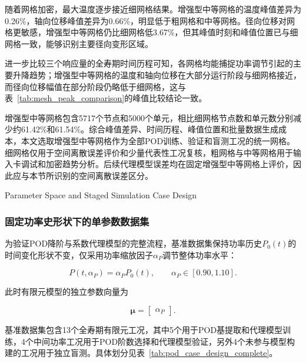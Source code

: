 随着网格加密，最大温度逐步接近细网格结果。增强型中等网格的温度峰值差异为0.26\%，轴向位移峰值差异为0.66\%，明显低于粗网格和中等网格。径向位移对网格更敏感，增强型中等网格仍比细网格低3.67\%，但其峰值时刻和峰值位置已与细网格一致，能够识别主要径向变形区域。

进一步比较三个响应量的全寿期时间历程可知，各网格均能捕捉功率调节引起的主要升降趋势；增强型中等网格的温度和轴向位移在大部分运行阶段与细网格接近，而径向位移幅值在部分阶段仍略低于细网格，这与表~\ref{tab:mesh_peak_comparison}的峰值比较结论一致。

增强型中等网格包含5717个节点和5000个单元，相比细网格节点数和单元数分别减少约61.42\%和61.54\%。综合峰值差异、时间历程、峰值位置和批量数据生成成本，本文选取增强型中等网格作为全部POD训练、验证和盲测工况的统一网格。细网格仅用于空间离散误差评价和少量代表性工况复核，粗网格与中等网格用于输入卡调试和加密趋势分析。后续代理模型误差均在固定增强型中等网格上评价，因此应与本节所识别的空间离散误差区分。

{Parameter Space and Staged Simulation Case Design}

\subsubsection{固定功率史形状下的单参数数据集}

为验证POD降阶与系数代理模型的完整流程，基准数据集保持功率历史$P_0(t)$的时间变化形状不变，仅采用功率缩放因子$\alpha_P$调节整体功率水平：

\begin{equation}
	P(t,\alpha_P)=\alpha_P P_0(t),
	\qquad
	\alpha_P\in[0.90,1.10].
	\label{eq:scaled_power_history_ch6}
\end{equation}

此时有限元模型的独立参数向量为

\begin{equation}
	\boldsymbol{\mu}=\begin{bmatrix}\alpha_P\end{bmatrix}.
	\label{eq:current_parameter_vector}
\end{equation}

基准数据集包含13个全寿期有限元工况，其中5个用于POD基提取和代理模型训练，4个中间功率工况用于POD阶数选择和代理模型验证，另外4个未参与模型构建的工况用于独立盲测。具体划分见表~\ref{tab:pod_case_design_complete}。

